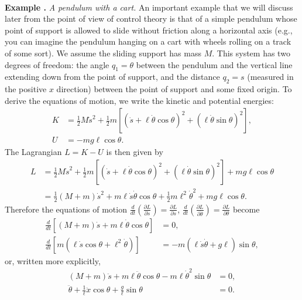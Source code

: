 \documentclass[12pt]{amsart}
\newcommand{\eqst}[1]{\begin{align*}#1\end{align*}}
\newcommand{\der}[2]{\frac{d#1}{d#2}}
\newcommand{\pder}[2]{\frac{\partial#1}{\partial#2}}
\newcounter{example}
\newcommand{\beginexample}[1]{\ \\ \addtocounter{example}{1} \textbf{Example \arabic{example}.} \textit{#1.}}
\begin{document}
\beginexample{A pendulum with a cart}
An important example that we will discuss later from the point of view of control theory is that of a simple pendulum whose point of support is allowed to slide without friction along a horizontal axis (e.g., you can imagine the pendulum hanging on a cart with wheels rolling on a track of some sort). We assume the sliding support has mass $M$. This system has two degrees of freedom: the angle $q_1 = \theta$ between the pendulum and the vertical line extending down from the point of support, and the distance $q_2 = s$ (measured in the positive $x$ direction) between the point of support and some fixed origin. To derive the equations of motion, we write the kinetic and potential energies:
\eqst{
K &= \tfrac12 M \dot{s}^2 + \tfrac12 m \left[ \left(\dot{s}+\ell \dot{\theta} \cos \theta \right)^2 + \left(\ell \dot{\theta} \sin \theta \right)^2 \right], \\
U &= -mg \ell \cos \theta.
}
The Lagrangian $L=K-U$ is then given by
\eqst{
L &=
\tfrac12 M \dot{s}^2 + \tfrac12 m \left[ \left(\dot{s}+\ell \dot{\theta} \cos \theta \right)^2 + \left(\ell \dot{\theta} \sin \theta \right)^2 \right] + mg \ell \cos \theta \\
&= \tfrac12(M+m)\dot{s}^2 + m\ell \dot{s} \dot{\theta} \cos \theta + \tfrac12 m \ell^2 \dot{\theta}^2 + mg\ell \cos\theta.
}
Therefore the equations of motion $\der{}{t}\left(\pder{L}{\dot{s}}\right)=\pder{L}{s}$,
$\der{}{t}\left(\pder{L}{\dot{\theta}}\right)=\pder{L}{\theta}$ become
\eqst{
\der{}{t}\left[ (M+m)\dot{s} + m\ell\dot{\theta}\cos \theta \right] &= 0, \\
\der{}{t}\left[m(\ell \dot{s}  \cos\theta + \ell^2 \dot{\theta})\right] &= -m(\ell\dot{s} \dot{\theta} + g\ell)\sin \theta, 
}
or, written more explicitly,
\eqst{
(M+m)\ddot{s} + m\ell \ddot{\theta} \cos \theta -m\ell \dot{\theta}^2 \sin\theta &= 0, \\
\ddot{\theta} + \frac{1}{\ell}\ddot{x} \cos\theta + \frac{g}{\ell}  \sin\theta &= 0.
}
\end{document}
